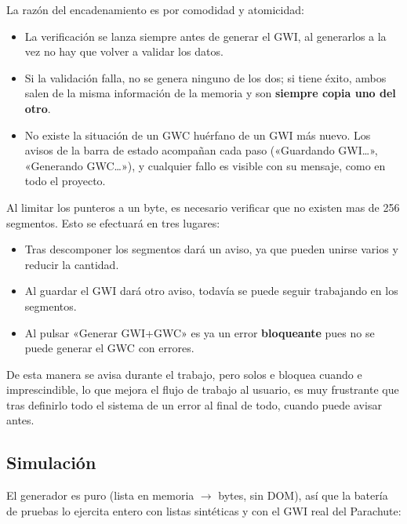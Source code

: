 La razón del encadenamiento es por comodidad y atomicidad:
\begin{itemize}
	\item La verificación se lanza siempre antes de generar el GWI, al generarlos a la vez no hay que volver a validar los datos.
	\item Si la validación falla, no se genera ninguno de los dos; si tiene éxito, ambos salen de la misma información de la memoria y son \textbf{siempre copia uno del otro}.
	\item No existe la situación de un GWC huérfano de un GWI más nuevo. Los avisos de la barra de estado acompañan cada paso («Guardando GWI…», «Generando GWC…»), y cualquier fallo es visible con su mensaje, como en todo el proyecto.
\end{itemize}

Al limitar los punteros a un byte, es necesario verificar que no existen mas de 256 segmentos. Esto se efectuará en tres lugares: 

\begin{itemize}
	\item Tras descomponer los segmentos dará un aviso, ya que pueden unirse varios y reducir la cantidad.
	\item Al guardar el GWI dará otro aviso, todavía se puede seguir trabajando en los segmentos.
	\item Al pulsar «Generar GWI+GWC» es ya un error \textbf{bloqueante} pues no se puede generar el GWC con errores. 
\end{itemize}

De esta manera se avisa durante el trabajo, pero solos e bloquea cuando e imprescindible, lo que mejora el flujo de trabajo al usuario, es muy frustrante que tras definirlo todo el sistema de un error al final de todo, cuando puede avisar antes.

\subsection{Simulación}
\label{sec:F5I3Simulacion}

El generador es puro (lista en memoria $\rightarrow$ bytes, sin
DOM), así que la batería de pruebas lo ejercita entero con listas
sintéticas y con el GWI real del Parachute:

